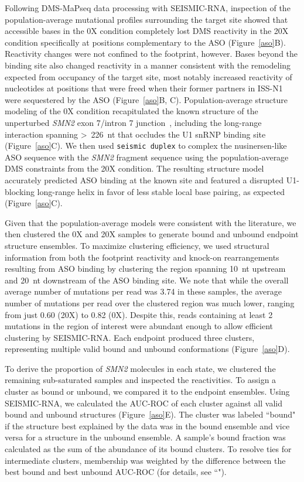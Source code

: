 \documentclass[unnumsec,webpdf,contemporary,large]{oup-authoring-template}%
\theoremstyle{thmstyleone}%
\theoremstyle{thmstyletwo}%
\theoremstyle{thmstylethree}%
\begin{document}
Following DMS-MaPseq data processing with SEISMIC-RNA, inspection of the population-average mutational profiles surrounding the target site showed that accessible bases in the 0X condition completely lost DMS reactivity in the 20X condition specifically at positions complementary to the ASO (Figure~\ref{aso}B). Reactivity changes were not confined to the footprint, however. Bases beyond the binding site also changed reactivity in a manner consistent with the remodeling expected from occupancy of the target site, most notably increased reactivity of nucleotides at positions that were freed when their former partners in ISS-N1 were sequestered by the ASO (Figure~\ref{aso}B, C). Population-average structure modeling of the 0X condition recapitulated the known structure of the unperturbed \textit{SMN2} exon 7/intron 7 junction~\cite{Singh2017}, including the long-range interaction spanning \textgreater~226~nt that occludes the U1 snRNP binding site~\cite{Singh2013} (Figure~\ref{aso}C). We then used \verb|seismic duplex| to complex the nusinersen-like ASO sequence with the \textit{SMN2} fragment sequence using the population-average DMS constraints from the 20X condition. The resulting structure model accurately predicted ASO binding at the known site and featured a disrupted U1-blocking long-range helix in favor of less stable local base pairing, as expected~\cite{Singh2017} (Figure~\ref{aso}C).

Given that the population-average models were consistent with the literature, we then clustered the 0X and 20X samples to generate bound and unbound endpoint structure ensembles. To maximize clustering efficiency, we used structural information from both the footprint reactivity and knock-on rearrangements resulting from ASO binding by clustering the region spanning 10~nt upstream and 20~nt downstream of the ASO binding site. We note that while the overall average number of mutations per read was 3.74 in these samples, the average number of mutations per read over the clustered region was much lower, ranging from just 0.60 (20X) to 0.82 (0X). Despite this, reads containing at least 2 mutations in the region of interest were abundant enough to allow efficient clustering by SEISMIC-RNA. Each endpoint produced three clusters, representing multiple valid bound and unbound conformations (Figure~\ref{aso}D).

To derive the proportion of \textit{SMN2} molecules in each state, we clustered the remaining sub-saturated samples and inspected the reactivities. To assign a cluster as bound or unbound, we compared it to the endpoint ensembles. Using SEISMIC-RNA, we calculated the AUC-ROC of each cluster against all valid bound and unbound structures (Figure~\ref{aso}E). The cluster was labeled ``bound" if the structure best explained by the data was in the bound ensemble and vice versa for a structure in the unbound ensemble. A sample's bound fraction was calculated as the sum of the abundance of its bound clusters. To resolve ties for intermediate clusters, membership was weighted by the difference between the best bound and best unbound AUC-ROC (for details, see ``").
\end{document}
